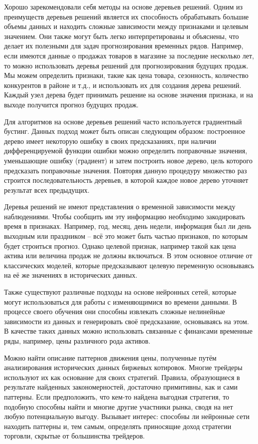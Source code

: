 \documentclass[diploma]{nanolab2015}
\begin{document}
Хорошо зарекомендовали себя методы на основе деревьев решений. Одним из преимуществ деревьев решений является их способность обрабатывать большие объемы данных и находить сложные зависимости между признаками и целевым значением. Они также могут быть легко интерпретированы и объяснены, что делает их полезными для задач прогнозирования временных рядов. Например, если имеются данные о продажах товаров в магазине за последние несколько лет, то можно использовать деревья решений для прогнозирования будущих продаж. Мы можем определить признаки, такие как цена товара, сезонность, количество конкурентов в районе и т.д., и использовать их для создания дерева решений. Каждый узел дерева будет принимать решение на основе значения признака, и на выходе получится прогноз будущих продаж.

Для алгоритмов на основе деревьев решений часто используется градиентный бустинг. Данных подход может быть описан следующим образом: построенное дерево имеет некоторую ошибку в своих предсказаниях, при наличии дифференцируемой функции ошибки можно определить поправочные значения, уменьшающие ошибку (градиент) и затем построить новое дерево, цель которого предсказать поправочные значения. Повторяя данную процедуру множество раз строится последовательность деревьев, в которой каждое новое дерево уточняет результат всех предыдущих\cite{book6}.

Деревья решений не имеют представления о временной зависимости между наблюдениями. Чтобы сообщить им эту информацию необходимо закодировать время в признаках. Например, год, месяц, день недели, информация был ли день выходным или праздником -- всё это может быть частью признаков, по которым будет строиться прогноз. Однако целевой признак, например такой как цена актива или величина продаж не должны включаться. В этом основное отличие от классических моделей, которые предсказывают целевую переменную основываясь на её же значениях в исторических данных.

Также существуют различные подходы на основе нейронных сетей, которые могут использоваться для работы с изменяющимися во времени данными. В процессе своего обучения они способны извлекать сложные нелинейные зависимости из данных и генерировать своё предсказание, основываясь на этом. В качестве таких данных можно использовать связанные с финансами временные ряды, например, цены различного рода активов.

Можно найти описание паттернов движения цены, полученные путём анализирования исторических данных биржевых котировок. Многие трейдеры используют их как основание для своих стратегий. Правила, образующиеся в результате найденных закономерностей, достаточно примитивны, как и сами паттерны. Если предположить, что кем-то найдена выгодная стратегия, то подобную способны найти и многие другие участники рынка, сводя на нет любую потенциальную выгоду. Вызывает интерес: способны ли нейронные сети находить паттерны и, тем самым, определять приносящие доход стратегии торговли, скрытые от большинства трейдеров.
\end{document}
